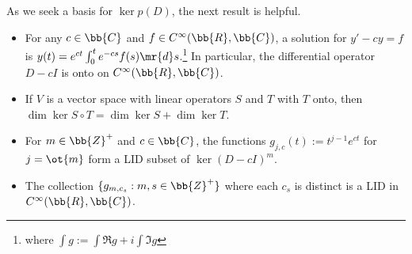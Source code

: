 As we seek a basis for $\ker p(D)$, the next result is helpful.
\begin{lem}\label{l:particular-soln}
\begin{itemize}
\item For any $c \in \bb{C}$ and $f \in C^\infty (\bb{R}, \bb{C})$, a solution for $y'-cy=f$ is $y(t)=e^{ct}\int_0^te^{-cs}f(s)\mr{d}s$.\footnote{where $\int g:= \int \Re g+i \int \Im g$} In particular, the differential operator $D-cI$ is onto on $C^\infty (\bb{R}, \bb{C})$.
\item If $V$ is a vector space with linear operators $S$ and $T$ with $T$ onto, then $\dim \ker S \circ T= \dim \ker S+ \dim \ker T$.
\item For $m \in \bb{Z}^+$ and $c \in \bb{C}$, the functions $g_{j,c}(t):=t^{j-1}e^{ct}$ for $j=\ot{m}$ form a LID subset of $\ker (D-cI)^m$.%
\item The collection $\{ g_{m,c_s}:m,s \in \bb{Z}^+ \}$ where each $c_s$ is distinct is a LID in $C^\infty(\bb{R},\bb{C})$.
\end{itemize}
\end{lem}
